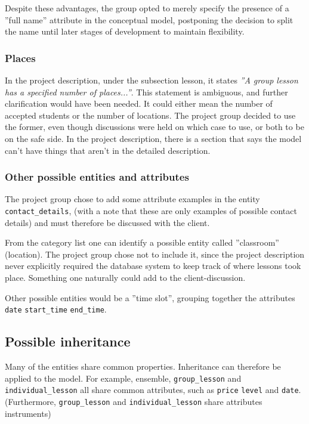 \documentclass[a4paper]{scrartcl}
\begin{document}
Despite these advantages, the group opted to merely specify the presence of a
''full name'' attribute in the conceptual model, postponing the decision to split
the name until later stages of development to maintain flexibility.

\subsubsection*{Places}
In the project description, under the subsection lesson, it states 
\emph{''A group lesson has a specified number of places...''}. 
This statement is ambiguous,
and further clarification would have been needed. It could either mean the
number of accepted students or the number of locations. The project group
decided to use the former, even though discussions were held on which case to
use,  or both to be on the safe side.  In the project description, there is a
section that says the model can't have things that aren't in the detailed
description.

\subsubsection*{Other possible entities and attributes}
The project group chose to add some attribute examples in the entity 
\verb|contact_details|,
(with a note that these
are only examples of possible contact details) and 
must therefore be discussed 
with the client. 

From the category list one can identify a possible entity
called ''classroom'' (location).
The project group chose not to include it, 
since the project description never explicitly required 
the database system to keep track of where lessons took place.
Something one naturally could add to the client-discussion. 

Other possible entities would be a ''time slot'', grouping 
together the attributes
\verb|date|
\verb|start_time|
\verb|end_time|.

\subsection*{Possible inheritance}
Many of the entities share common properties. 
Inheritance can therefore be applied to the model. 
For example, 
ensemble, 
\verb|group_lesson| and 
\verb|individual_lesson| 
all share common attributes, such as 
\verb|price|
\verb|level| and 
\verb|date|. 
(Furthermore, 
\verb|group_lesson| and 
\verb|individual_lesson| share attributes instruments)
\end{document}
